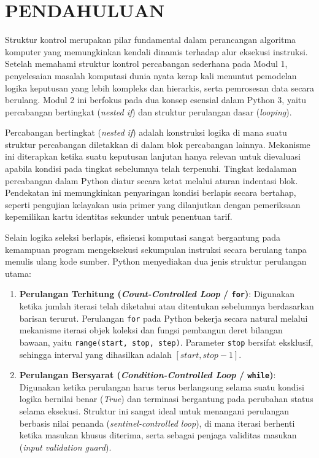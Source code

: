 \documentclass[12pt,a4paper]{article}
\begin{document}
\section{PENDAHULUAN}
Struktur kontrol merupakan pilar fundamental dalam perancangan algoritma komputer yang memungkinkan kendali dinamis terhadap alur eksekusi instruksi. Setelah memahami struktur kontrol percabangan sederhana pada Modul 1, penyelesaian masalah komputasi dunia nyata kerap kali menuntut pemodelan logika keputusan yang lebih kompleks dan hierarkis, serta pemrosesan data secara berulang. Modul 2 ini berfokus pada dua konsep esensial dalam Python 3, yaitu percabangan bertingkat (\textit{nested if}) dan struktur perulangan dasar (\textit{looping}).

Percabangan bertingkat (\textit{nested if}) adalah konstruksi logika di mana suatu struktur percabangan diletakkan di dalam blok percabangan lainnya. Mekanisme ini diterapkan ketika suatu keputusan lanjutan hanya relevan untuk dievaluasi apabila kondisi pada tingkat sebelumnya telah terpenuhi. Tingkat kedalaman percabangan dalam Python diatur secara ketat melalui aturan indentasi blok. Pendekatan ini memungkinkan penyaringan kondisi berlapis secara bertahap, seperti pengujian kelayakan usia primer yang dilanjutkan dengan pemeriksaan kepemilikan kartu identitas sekunder untuk penentuan tarif.

Selain logika seleksi berlapis, efisiensi komputasi sangat bergantung pada kemampuan program mengeksekusi sekumpulan instruksi secara berulang tanpa menulis ulang kode sumber. Python menyediakan dua jenis struktur perulangan utama:
\begin{enumerate}
    \item \textbf{Perulangan Terhitung (\textit{Count-Controlled Loop} / \texttt{for})}: Digunakan ketika jumlah iterasi telah diketahui atau ditentukan sebelumnya berdasarkan barisan terurut. Perulangan \texttt{for} pada Python bekerja secara natural melalui mekanisme iterasi objek koleksi dan fungsi pembangun deret bilangan bawaan, yaitu \texttt{range(start, stop, step)}. Parameter \texttt{stop} bersifat eksklusif, sehingga interval yang dihasilkan adalah $[start, stop - 1]$.
    \item \textbf{Perulangan Bersyarat (\textit{Condition-Controlled Loop} / \texttt{while})}: Digunakan ketika perulangan harus terus berlangsung selama suatu kondisi logika bernilai benar (\textit{True}) dan terminasi bergantung pada perubahan status selama eksekusi. Struktur ini sangat ideal untuk menangani perulangan berbasis nilai penanda (\textit{sentinel-controlled loop}), di mana iterasi berhenti ketika masukan khusus diterima, serta sebagai penjaga validitas masukan (\textit{input validation guard}).
\end{enumerate}
\end{document}
